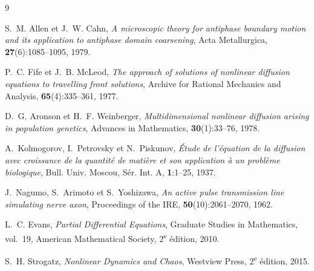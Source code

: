 \documentclass[11pt,a4paper]{article}
\theoremstyle{plain}
\theoremstyle{remark}
\begin{document}
\clearpage
\begin{thebibliography}{9}

S.~M. Allen et J.~W. Cahn,
\emph{A microscopic theory for antiphase boundary motion and its application to
antiphase domain coarsening}, Acta Metallurgica, \textbf{27}(6):1085--1095, 1979.

P.~C. Fife et J.~B. McLeod,
\emph{The approach of solutions of nonlinear diffusion equations to travelling
front solutions}, Archive for Rational Mechanics and Analysis,
\textbf{65}(4):335--361, 1977.

D.~G. Aronson et H.~F. Weinberger,
\emph{Multidimensional nonlinear diffusion arising in population genetics},
Advances in Mathematics, \textbf{30}(1):33--76, 1978.

A.~Kolmogorov, I.~Petrovsky et N.~Piskunov,
\emph{Étude de l'équation de la diffusion avec croissance de la quantité de
matière et son application à un problème biologique}, Bull. Univ. Moscou,
Sér. Int. A, \textbf{1}:1--25, 1937.

J.~Nagumo, S.~Arimoto et S.~Yoshizawa,
\emph{An active pulse transmission line simulating nerve axon},
Proceedings of the IRE, \textbf{50}(10):2061--2070, 1962.

L.~C. Evans,
\emph{Partial Differential Equations}, Graduate Studies in Mathematics, vol.~19,
American Mathematical Society, 2\textsuperscript{e} édition, 2010.

S.~H. Strogatz,
\emph{Nonlinear Dynamics and Chaos}, Westview Press,
2\textsuperscript{e} édition, 2015.

\end{thebibliography}
\end{document}
